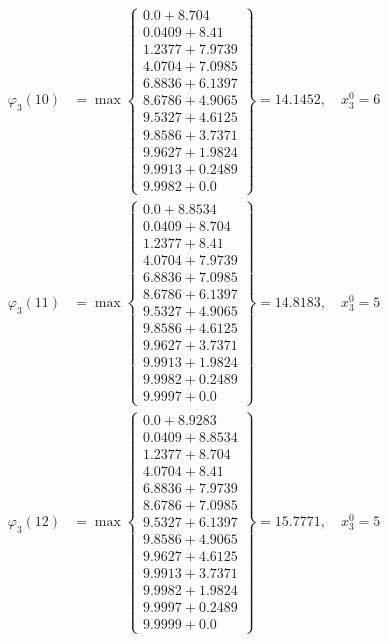 \documentclass{article}
\begin{document}
\begin{align*}
\varphi_{3}(10) &= \max \left\{ \begin{array}{c}
0.0 + 8.704 \\
 0.0409 + 8.41 \\
 1.2377 + 7.9739 \\
 4.0704 + 7.0985 \\
 6.8836 + 6.1397 \\
 8.6786 + 4.9065 \\
 9.5327 + 4.6125 \\
 9.8586 + 3.7371 \\
 9.9627 + 1.9824 \\
 9.9913 + 0.2489 \\
 9.9982 + 0.0
\end{array} \right\}=14.1452, \quad x_{3}^0=6\\
  
\varphi_{3}(11) &= \max \left\{ \begin{array}{c}
0.0 + 8.8534 \\
 0.0409 + 8.704 \\
 1.2377 + 8.41 \\
 4.0704 + 7.9739 \\
 6.8836 + 7.0985 \\
 8.6786 + 6.1397 \\
 9.5327 + 4.9065 \\
 9.8586 + 4.6125 \\
 9.9627 + 3.7371 \\
 9.9913 + 1.9824 \\
 9.9982 + 0.2489 \\
 9.9997 + 0.0
\end{array} \right\}=14.8183, \quad x_{3}^0=5\\
  
\varphi_{3}(12) &= \max \left\{ \begin{array}{c}
0.0 + 8.9283 \\
 0.0409 + 8.8534 \\
 1.2377 + 8.704 \\
 4.0704 + 8.41 \\
 6.8836 + 7.9739 \\
 8.6786 + 7.0985 \\
 9.5327 + 6.1397 \\
 9.8586 + 4.9065 \\
 9.9627 + 4.6125 \\
 9.9913 + 3.7371 \\
 9.9982 + 1.9824 \\
 9.9997 + 0.2489 \\
 9.9999 + 0.0
\end{array} \right\}=15.7771, \quad x_{3}^0=5\\
  

\end{align*}
\end{document}
